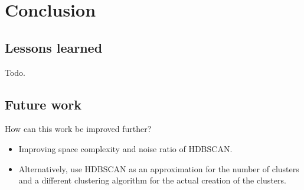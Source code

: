 \section{Conclusion}

\subsection{Lessons learned}
Todo.

\subsection{Future work}

How can this work be improved further?

\begin{itemize}
    \item Improving space complexity and noise ratio of HDBSCAN.
    \item Alternatively, use HDBSCAN as an approximation for the number of clusters and a different clustering algorithm
    for the actual creation of the clusters.
\end{itemize}
